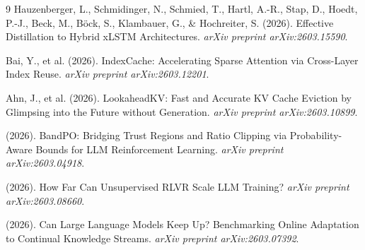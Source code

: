 \documentclass[11pt]{article}
\begin{document}
\begin{thebibliography}{9}
 Hauzenberger, L., Schmidinger, N., Schmied, T., Hartl, A.-R., Stap, D., Hoedt, P.-J., Beck, M., B\"{o}ck, S., Klambauer, G., \& Hochreiter, S. (2026). Effective Distillation to Hybrid xLSTM Architectures. \textit{arXiv preprint arXiv:2603.15590}.

 Bai, Y., et al. (2026). IndexCache: Accelerating Sparse Attention via Cross-Layer Index Reuse. \textit{arXiv preprint arXiv:2603.12201}.

 Ahn, J., et al. (2026). LookaheadKV: Fast and Accurate KV Cache Eviction by Glimpsing into the Future without Generation. \textit{arXiv preprint arXiv:2603.10899}.

 (2026). BandPO: Bridging Trust Regions and Ratio Clipping via Probability-Aware Bounds for LLM Reinforcement Learning. \textit{arXiv preprint arXiv:2603.04918}.

 (2026). How Far Can Unsupervised RLVR Scale LLM Training? \textit{arXiv preprint arXiv:2603.08660}.

 (2026). Can Large Language Models Keep Up? Benchmarking Online Adaptation to Continual Knowledge Streams. \textit{arXiv preprint arXiv:2603.07392}.
\end{thebibliography}
\end{document}
